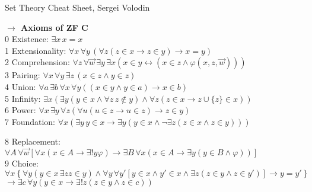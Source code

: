 \documentclass[9pt]{article}
\newcommand{\mytitle}[1]{ {\bf $\rightarrow$ #1}\\}
\begin{document}
\begin{center}
	{\large Set Theory Cheat Sheet},
	Sergei Volodin
\end{center}
\setlength\multicolsep{0pt}
\begin{multicols}{2}
\mytitle{Axioms of Z{\color{blue}F}{\color{red} C}}
0 Existence: $\exists x\, x=x$\\
1 Extensionality: $\forall x\,\forall y\,\left(\forall z \left(z\in x\to z\in y\right)\to x=y \right)$\\
2 Comprehension: $\forall z\,\forall \vec{w}\,\exists y\,\exists x\left(x\in y\leftrightarrow \left(x\in z \wedge\varphi(x,z,\vec{w})\right)\right)$\\
3 Pairing: $\forall x\,\forall y\,\exists z\,\left(x\in z\wedge y\in z\right)$\\
4 Union: $\forall a\,\exists b\,\forall x\,\forall y\left((x\in y\wedge y\in a)\to x\in b\right)$\\
5 Infinity: $\exists x\left(\exists y(y\in x\wedge\forall z\,z\notin y)\wedge \forall z(z\in x\to z\cup \{z\}\in x)\right)$\\
6 Power: $\forall x\,\exists y\,\forall z\left(\forall u(u\in z\to u\in z)\to z\in y\right)$\\
7 Foundation: $\forall x\left(\exists y\,y\in x\to\exists y(y\in x\wedge \neg \exists z(z\in x\wedge z\in y))\right)$
\end{multicols}
{\color{blue}8 Replacement:} $\forall A\,\forall\vec{w}\left[\forall x(x\in A\to\exists !y\varphi)\to\exists B\,\forall x(x\in A\to \exists y(y\in B\wedge \varphi))\right]$\\
{\color{red}9 Choice:} $\forall x \left\{\forall y(y\in x\,\exists z z\in y)\wedge \forall y\,\forall y'\left[y\in x\wedge y'\in x\wedge \exists z (z\in y\wedge z\in y')\right]\to y=y'\right\}$ $\to\exists c\,\forall y(y\in x\to\exists !z(z\in y\wedge z\in c))$
\noindent\makebox[\linewidth]{\rule{\paperwidth}{0.1pt}}
\end{document}
